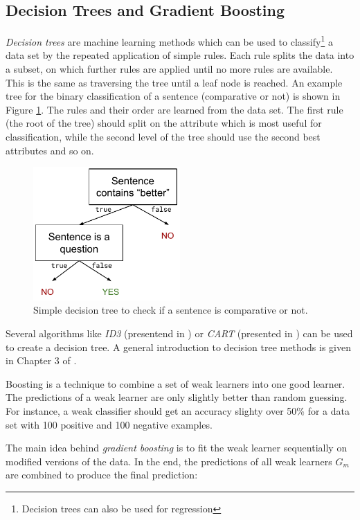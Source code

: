 \subsection{Decision Trees and Gradient Boosting}
\emph{Decision trees} are machine learning methods which can be used to classify\footnote{Decision trees can also be used for regression} a data set by the repeated application of simple rules. Each rule splits the data into a subset, on which further rules are applied until no more rules are available. This is the same as traversing the tree until a leaf node is reached. An example tree for the binary classification of a sentence (comparative or not) is shown in Figure \ref{fig:dectree}. The rules and their order are learned from the data set. The first rule (the root of the tree) should split on the attribute which is most useful for classification, while the second level of the tree should use the second best attributes and so on.

\begin{figure}[ht]
\centering
	\includegraphics[width=0.5\textwidth]{images/dectree}
	\caption{Simple decision tree to check if a sentence is comparative or not.}
		\label{fig:dectree}
\end{figure}

Several algorithms like \emph{ID3} (presentend in \cite{quinlan1986induction}) or \emph{CART} (presented in \cite{breiman2017classification}) can be used to create a decision tree. A general introduction to decision tree methods is given in Chapter 3 of \cite{mitchell1997machine}.

Boosting is a technique to combine a set of weak learners into one good learner. The predictions of a weak learner are only slightly better than random guessing. For instance, a weak classifier should get an accuracy slighty over 50\% for a data set with 100 positive and 100 negative examples.

The main idea behind \emph{gradient boosting} is to fit the weak learner sequentially on modified versions of the data. In the end, the predictions of all weak learners \emph{$G_m$} are combined to produce the final prediction:

